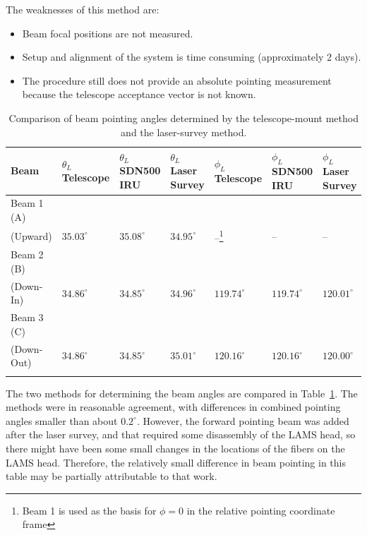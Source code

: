 \documentclass[12pt,twoside,english]{article}\usepackage[]{graphicx}\usepackage[]{color}
\providecommand{\tabularnewline}{\\}
\begin{document}
The weaknesses of this method are:  
\begin{itemize}
\item Beam focal positions are not measured. 

\item Setup and alignment of the system is time consuming (approximately 2 days). 

\item The procedure still does not provide an absolute pointing measurement because the telescope acceptance vector is not known.  
\end{itemize}

\begin{table}
{\footnotesize{}}%
\begin{minipage}[t]{0.93\columnwidth}%
\begin{tabular}{>{\centering}p{1.8cm}>{\centering}p{1.8cm}>{\centering}p{1.8cm}>{\centering}p{1.8cm}>{\centering}p{1.8cm}>{\centering}p{1.8cm}>{\centering}p{1.8cm}}
\toprule 
\textbf{Beam}  &
\textbf{$\theta_{L}$ Telescope}  &
\textbf{$\theta_{L}$ SDN500 IRU}  &
\textbf{$\theta_{L}$ Laser Survey}  &
\textbf{$\phi_{L}$ Telescope}  &
\textbf{$\phi_{L}$ SDN500 IRU}  &
\textbf{$\phi_{L}$ Laser Survey}\tabularnewline
\midrule
\midrule 
Beam 1 (A) &
 &
 &
 &
 &
 &
\tabularnewline
(Upward)  &
$35.03^{\circ}$  &
$35.08^{\circ}$  &
$34.95^{\circ}$  &
--\footnote{Beam 1 is used as the basis for $\phi=0$ in the relative pointing
coordinate frame}  &
--  &
-- \tabularnewline
\midrule 
Beam 2 (B) &
 &
 &
 &
 &
 &
\tabularnewline
(Down-In)  &
$34.86^{\circ}$  &
$34.85^{\circ}$  &
$34.96^{\circ}$  &
$119.74^{\circ}$  &
$119.74^{\circ}$  &
$120.01^{\circ}$\tabularnewline
\midrule 
Beam 3 (C) &
 &
 &
 &
 &
 &
\tabularnewline
(Down-Out)  &
$34.86^{\circ}$  &
$34.85^{\circ}$  &
$35.01^{\circ}$  &
$120.16^{\circ}$  &
$120.16^{\circ}$  &
$120.00^{\circ}$\tabularnewline
\midrule 
  &
 &
 &
 &
 &
 &
\tabularnewline
\end{tabular}%
\end{minipage}{\footnotesize \par}
\protect\caption{Comparison of beam pointing angles determined by the telescope-mount method and the laser-survey method.\label{tab:PointingAngles}}
\end{table}

The two methods for determining the beam angles are compared in Table~\ref{tab:PointingAngles}. The methods were in reasonable agreement, with differences in combined pointing angles smaller than about $0.2^{\circ}$. However, the forward pointing beam was added after the laser survey, and that required some disassembly of the LAMS head, so there might have been some small changes in the locations of the fibers on the LAMS head. Therefore, the relatively small difference in beam pointing in this table may be partially attributable to that work. 
\end{document}

